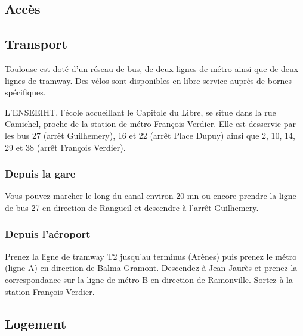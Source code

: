 
\subsection{Accès}


\subsection{Transport}

Toulouse est doté d'un réseau de bus, de deux lignes de métro ainsi que de
deux lignes de tramway. Des vélos sont disponibles en libre service auprès
de bornes spécifiques.

L'ENSEEIHT, l'école accueillant le Capitole du Libre, se situe dans la rue
Camichel, proche de la station de métro François Verdier. Elle est desservie
par les bus 27 (arrêt Guilhemery), 16 et 22 (arrêt Place Dupuy) ainsi que 2,
10, 14, 29 et 38 (arrêt François Verdier).

\subsubsection{Depuis la gare}

Vous pouvez marcher le long du canal environ 20 mn ou encore prendre la
ligne de bus 27 en direction de Rangueil et descendre à l'arrêt Guilhemery.

\subsubsection{Depuis l'aéroport}

Prenez la ligne de tramway T2 jusqu'au terminus (Arènes) puis prenez le métro
(ligne A) en direction de Balma-Gramont. Descendez à Jean-Jaurès et prenez
la correspondance sur la ligne de métro B en direction de Ramonville. Sortez
à la station François Verdier.

\subsection{Logement}


